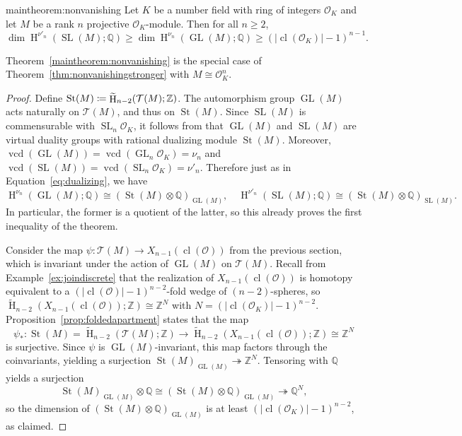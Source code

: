 \documentclass[11 pt]{article}
\newenvironment{theorem-prime}[1]{\renewcommand\theinnerthm{\ref*{#1}$'$}\innerthm}{\endinnerthm}
\theoremstyle{plain}
\theoremstyle{definition}
\numberwithin{equation}{section}
\DeclareMathOperator{\GL}{GL}
\DeclareMathOperator{\SL}{SL}
\newcommand\Z{\ensuremath{\mathbb{Z}}}
\newcommand\Q{\ensuremath{\mathbb{Q}}}
\DeclareMathOperator{\HH}{H}
\renewcommand{\O}{\mathcal{O}}
\DeclareMathOperator{\vcd}{vcd}
\DeclareMathOperator{\class}{cl}
\newcommand\Tits{\ensuremath{\mathcal{T}}}
\DeclareMathOperator{\St}{St}
\newcommand\onto{\twoheadrightarrow}
\newcommand\coloneq{\mathrel{\mathop:}\mkern-1.2mu=}
\newcommand\abs[1]{\left\lvert#1\right\rvert}
\newcommand\tensor{\otimes}
\newcommand\iso{\cong}
\newcommand\GLvcd{\nu_n}
\newcommand\SLvcd{\nu'_n}
\newcommand{\change}{}
\begin{document}
\begin{theorem-prime}{maintheorem:nonvanishing}
\label{thm:nonvanishingstronger}
Let $K$ be a number field with ring of integers $\O_K$ and let $M$ be a rank $n$ projective $\O_K$-module. Then for all $n\geq 2$,
\[\dim \HH^{\SLvcd}(\SL(M);\Q)\geq \dim \HH^{\GLvcd}(\GL(M);\Q)\geq (\abs{\class(\O_K)}-1)^{n-1}.\]
\end{theorem-prime}
 Theorem~\ref{maintheorem:nonvanishing}
is the special case of Theorem~\ref{thm:nonvanishingstronger} with $M \iso \O_K^n$. 
\begin{proof}
Define $\St(M)\coloneq \widetilde{\HH}_{n-2}(\Tits(M);\Z)$. %
The automorphism group $\GL(M)$ acts naturally on $\Tits(M)$, and thus on $\St(M)$.  Since $\SL(M)$ is commensurable with 
$\SL_n\O_K$, it follows from \cite[Theorems 3.2, 3.3]{BieriEckmannDuality} that 
$\GL(M)$ and $\SL(M)$ are virtual duality groups with rational dualizing module $\St(M)$. Moreover, $\vcd(\GL(M))=\vcd(\GL_n\O_K)=\GLvcd$ and $\vcd(\SL(M))=\vcd(\SL_n\O_K)=\SLvcd$. Therefore just as in Equation~\eqref{eq:dualizing}, we have
\[\HH^{\GLvcd}(\GL(M);\Q)\iso (\St(M)\tensor \Q)_{\GL(M)},\quad \HH^{\SLvcd}(\SL(M);\Q)\iso(\St(M)\tensor \Q)_{\SL(M)}.\]
In particular, the former is a quotient of the latter, \change so this already proves the first inequality of the theorem.

Consider the map $\psi\colon \Tits(M)\to X_{n-1}(\class(\O))$ from the previous section, which is invariant under the action of $\GL(M)$ on $\Tits(M)$. Recall from Example~\ref{ex:joindiscrete} that the realization of $X_{n-1}(\class(\O))$
is homotopy equivalent to a $(\abs{\class(\O)} - 1)^{n-2}$-fold wedge of $(n-2)$-spheres, so $\widetilde{\HH}_{n-2}(X_{n-1}(\class(\O));\Z)\iso \Z^N$  with $N = (\abs{\class(\O_K)} - 1)^{n-2}$.
Proposition~\ref{prop:foldedapartment} states that the  map
\[\psi_{\ast}\colon \St(M)=\widetilde{\HH}_{n-2}(\Tits(M);\Z) \rightarrow \widetilde{\HH}_{n-2}(X_{n-1}(\class(\O));\Z)\iso \Z^N\] is surjective. 
Since $\psi$ is $\GL(M)$-invariant, this map factors through the coinvariants, yielding  a surjection $\St(M)_{\GL(M)}\onto \Z^N$. Tensoring with $\Q$ yields a surjection \[\St(M)_{\GL(M)}\tensor \Q\iso (\St(M)\tensor \Q)_{\GL(M)}\onto \Q^N,\]
so the dimension of $(\St(M)\tensor \Q)_{\GL(M)}$ is at least $(\abs{\class(\O_K)}-1)^{n-2}$, as claimed.
\end{proof}
\end{document}
